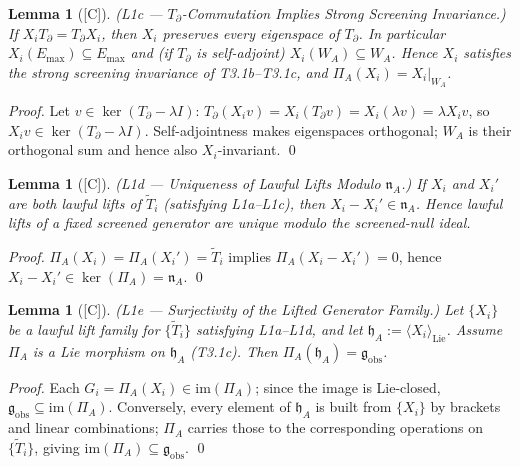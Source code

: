 \documentclass[12pt,oneside]{amsbook}
\theoremstyle{plain}
\newtheorem{lemma}[theorem]{Lemma}
\theoremstyle{definition}
\theoremstyle{remark}
\newcommand{\status}[1]{\textup{[#1]}}
\begin{document}
\begin{lemma}[\status{C}]\label{lem:L1c}
\textup{(L1c --- $T_\partial$-Commutation Implies Strong Screening Invariance.)}
If $X_i T_\partial = T_\partial X_i$, then $X_i$ preserves every eigenspace of
$T_\partial$. In particular $X_i(E_{\max}) \subseteq E_{\max}$ and (if
$T_\partial$ is self-adjoint) $X_i(W_A) \subseteq W_A$. Hence $X_i$ satisfies
the strong screening invariance of T3.1b--T3.1c, and $\Pi_A(X_i) = X_i|_{W_A}$.
\end{lemma}

\begin{proof}
Let $v \in \ker(T_\partial - \lambda I)$: $T_\partial(X_i v) = X_i(T_\partial v)
= X_i(\lambda v) = \lambda X_i v$, so $X_i v \in \ker(T_\partial - \lambda I)$.
Self-adjointness makes eigenspaces orthogonal; $W_A$ is their orthogonal sum
and hence also $X_i$-invariant. \qed
\end{proof}

\begin{lemma}[\status{C}]\label{lem:L1d}
\textup{(L1d --- Uniqueness of Lawful Lifts Modulo $\mathfrak{n}_A$.)}
If $X_i$ and $X_i'$ are both lawful lifts of $\widetilde{T}_i$ (satisfying L1a--L1c),
then $X_i - X_i' \in \mathfrak{n}_A$. Hence lawful lifts of a fixed screened
generator are unique modulo the screened-null ideal.
\end{lemma}

\begin{proof}
$\Pi_A(X_i) = \Pi_A(X_i') = \widetilde{T}_i$ implies
$\Pi_A(X_i - X_i') = 0$, hence $X_i - X_i' \in \ker(\Pi_A) = \mathfrak{n}_A$. \qed
\end{proof}

\begin{lemma}[\status{C}]\label{lem:L1e}
\textup{(L1e --- Surjectivity of the Lifted Generator Family.)}
Let $\{X_i\}$ be a lawful lift family for $\{\widetilde{T}_i\}$ satisfying L1a--L1d,
and let $\mathfrak{h}_A := \langle X_i \rangle_{\mathrm{Lie}}$.
Assume $\Pi_A$ is a Lie morphism on $\mathfrak{h}_A$ (T3.1c).
Then $\Pi_A(\mathfrak{h}_A) = \mathfrak{g}_{\mathrm{obs}}$.
\end{lemma}

\begin{proof}
Each $G_i = \Pi_A(X_i) \in \mathrm{im}(\Pi_A)$; since the image is Lie-closed,
$\mathfrak{g}_{\mathrm{obs}} \subseteq \mathrm{im}(\Pi_A)$. Conversely,
every element of $\mathfrak{h}_A$ is built from $\{X_i\}$ by brackets and linear
combinations; $\Pi_A$ carries those to the corresponding operations on
$\{\widetilde{T}_i\}$, giving $\mathrm{im}(\Pi_A) \subseteq
\mathfrak{g}_{\mathrm{obs}}$. \qed
\end{proof}
\end{document}
